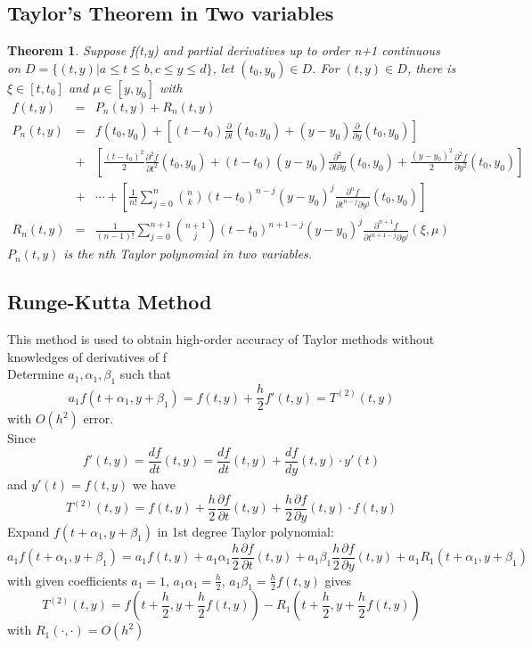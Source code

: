 \documentclass[12pt]{article}
\newtheorem{theorem}{Theorem}[subsection]
\begin{document}
\subsection{Taylor's Theorem in Two variables}
\begin{theorem}
	Suppose f(t,y) and partial derivatives up to order n+1 continuous on $D = \{(t,y) | a \leq t \leq b, c \leq y \leq d\}$, let $(t_0,y_0) \in D$. For $(t,y) \in D$, there is $\xi \in [t,t_0]$ and $\mu \in [y,y_0]$ with 
	\begin{eqnarray*}
		f(t,y)   &=& P_n(t,y) + R_n(t,y) \\
		P_n(t,y) &=& f(t_0,y_0) + \left[(t-t_0)\frac{\partial}{\partial t}(t_0,y_0) + (y-y_0)\frac{\partial}{\partial y}(t_0,y_0)\right] \\
				 &+& \left[\frac{(t-t_0)^2}{2}\frac{\partial^2f}{\partial t^2}(t_0,y_0) + (t-t_0)(y-y_0)\frac{\partial^2}{\partial t \partial y}(t_0,y_0) + \frac{(y-y_0)^2}{2}\frac{\partial^2 f}{\partial y^2}(t_0,y_0)\right] \\
				 &+& \cdots  + \left[ \frac{1}{n!}\sum_{j=0}^n {n \choose k} (t-t_0)^{n-j}(y-y_0)^j \frac{\partial^nf}{\partial t^{n-j} \partial y^j}(t_0,y_0)\right] \\
		R_n(t,y) &=& \frac{1}{(n-1)!}\sum_{j=0}^{n+1}{n+1 \choose j}(t-t_0)^{n+1-j}(y-y_0)^j\frac{\partial^{n+1}f}{\partial t^{n+1-j}\partial y^j}(\xi, \mu)
	\end{eqnarray*}
$P_n(t,y)$ is the nth Taylor polynomial in two variables. 
\end{theorem}
\subsection{Runge-Kutta Method}
This method is used to obtain high-order accuracy of Taylor methods without knowledges of derivatives of f \\
Determine $a_1,\alpha_1, \beta_1$ such that $$a_1f(t+\alpha_1, y + \beta_1) = f(t,y) + \frac{h}{2}f'(t,y) = T^{(2)}(t,y)$$ with $O(h^2)$ error. \\
Since $$f'(t,y) = \frac{df}{dt}(t,y) = \frac{df}{dt}(t,y) + \frac{df}{dy}(t,y)\cdot y'(t)$$ and $y'(t) = f(t,y)$ we have $$T^{(2)}(t,y) = f(t,y) + \frac{h}{2} \frac{\partial f}{\partial t}(t,y) + \frac{h}{2}\frac{\partial f}{\partial y}(t,y) \cdot f(t,y)$$ 
Expand $f(t+\alpha_1, y + \beta_1)$ in 1st degree Taylor polynomial: $$a_1f(t+\alpha_1, y + \beta_1)= a_1f(t,y) + a_1\alpha_1\frac{h}{2} \frac{\partial f}{\partial t}(t,y) + a_1\beta_1\frac{h}{2}\frac{\partial f}{\partial y}(t,y) + a_1R_1(t+\alpha_1,y+\beta_1)$$ 
with given coefficients $a_1 = 1$, $a_1\alpha_1 = \frac{h}{2}$, $a_1\beta_1 = \frac{h}{2}f(t,y)$ gives $$T^{(2)}(t,y) = f\left(t + \frac{h}{2}, y + \frac{h}{2}f(t,y)\right) - R_1 \left(t + \frac{h}{2},y + \frac{h}{2}f(t,y)\right)$$ with $R_1(\cdot,\cdot) = O(h^2)$
\end{document}
